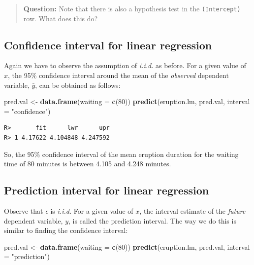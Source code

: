 \documentclass[english,10pt,a4paper,oneside]{book}
\newenvironment{Shaded}{\begin{snugshade}}{\end{snugshade}}
\newcommand{\KeywordTok}[1]{\textcolor[rgb]{0.13,0.29,0.53}{\textbf{#1}}}
\newcommand{\DataTypeTok}[1]{\textcolor[rgb]{0.13,0.29,0.53}{#1}}
\newcommand{\DecValTok}[1]{\textcolor[rgb]{0.00,0.00,0.81}{#1}}
\newcommand{\StringTok}[1]{\textcolor[rgb]{0.31,0.60,0.02}{#1}}
\newcommand{\NormalTok}[1]{#1}
\theoremstyle{definition}
\theoremstyle{definition}
\theoremstyle{definition}
\theoremstyle{remark}
\begin{document}
\begin{quote}
\textbf{Question:} Note that there is also a hypothesis test in the
\texttt{(Intercept)} row. What does this do?
\end{quote}

\subsection{Confidence interval for linear
regression}\label{confidence-interval-for-linear-regression}

Again we have to observe the assumption of \emph{i.i.d.} as before. For
a given value of \(x\), the 95\% confidence interval around the mean of
the \emph{observed} dependent variable, \(\bar{y}\), can be obtained as
follows:

\begin{Shaded}
\begin{Highlighting}[]
\NormalTok{pred.val <-}\StringTok{ }\KeywordTok{data.frame}\NormalTok{(}\DataTypeTok{waiting =} \KeywordTok{c}\NormalTok{(}\DecValTok{80}\NormalTok{))}
\KeywordTok{predict}\NormalTok{(eruption.lm, pred.val, }\DataTypeTok{interval =} \StringTok{"confidence"}\NormalTok{)}
\end{Highlighting}
\end{Shaded}

\begin{verbatim}
R>       fit      lwr      upr
R> 1 4.17622 4.104848 4.247592
\end{verbatim}

So, the 95\% confidence interval of the mean eruption duration for the
waiting time of 80 minutes is between 4.105 and 4.248 minutes.

\subsection{Prediction interval for linear
regression}\label{prediction-interval-for-linear-regression}

Observe that \(\epsilon\) is \emph{i.i.d.} For a given value of \(x\),
the interval estimate of the \emph{future} dependent variable, \(y\), is
called the prediction interval. The way we do this is similar to finding
the confidence interval:

\begin{Shaded}
\begin{Highlighting}[]
\NormalTok{pred.val <-}\StringTok{ }\KeywordTok{data.frame}\NormalTok{(}\DataTypeTok{waiting =} \KeywordTok{c}\NormalTok{(}\DecValTok{80}\NormalTok{))}
\KeywordTok{predict}\NormalTok{(eruption.lm, pred.val, }\DataTypeTok{interval =} \StringTok{"prediction"}\NormalTok{)}
\end{Highlighting}
\end{Shaded}
\end{document}
